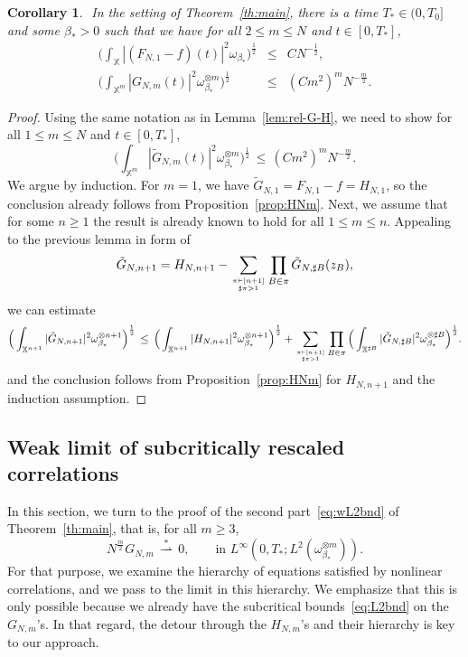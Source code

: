 \documentclass[a4paper,11pt,reqno,noindent]{amsart}
\theoremstyle{plain}
\newtheorem{cor}[theor]{Corollary}
\theoremstyle{definition}
\numberwithin{equation}{section}
\newcommand{\Xd}{\mathbb X}
\begin{document}
\begin{cor}\label{cor:estim-GNm-0}$ $
In the setting of Theorem~\ref{th:main}, there is a time $T_*\in(0,T_0]$ and some $\beta_*>0$ such that we have for all $2\le m\le N$ and $t\in[0,T_*]$,
\begin{eqnarray*}
\Big(\int_{\Xd}|(F_{N,1}-f)(t)|^2\omega_{\beta_*}\Big)^\frac12&\le&CN^{-\frac12},\\
\Big(\int_{\Xd^m}|G_{N,m}(t)|^2\omega_{\beta_*}^{\otimes m}\Big)^\frac12&\le&(Cm^2)^mN^{-\frac m2}.
\end{eqnarray*}
\end{cor}

\begin{proof}
Using the same notation as in Lemma~\ref{lem:rel-G-H}, we need to show for all $1\le m\le N$ and $t\in[0,T_*]$,
\[\Big(\int_{\Xd^m}|\tilde G_{N,m}(t)|^2\omega_{\beta_*}^{\otimes m}\Big)^\frac12\,\le\,(Cm^2)^mN^{-\frac m2}.\]
We argue by induction. For $m=1$, we have $\tilde G_{N,1}=F_{N,1}-f=H_{N,1}$, so the conclusion already follows from Proposition~\ref{prop:HNm}. Next, we assume that for some $n\ge1$ the result is already known to hold for all $1\le m\le n$.
Appealing to the previous lemma in form of
\[\tilde G_{N,n+1}=H_{N,n+1}-\sum_{\pi\vdash[n+1]\atop\sharp\pi>1}\prod_{B\in\pi}\tilde G_{N,\sharp B}(z_B),\]
we can estimate
\begin{equation*}
\Big(\int_{\Xd^{n+1}} |\tilde G_{N,n+1}|^2\omega_{\beta_*}^{\otimes n+1}\Big)^\frac12
\,\le\,\Big(\int_{\Xd^{n+1}} |H_{N,n+1}|^2 \omega_{\beta_*}^{\otimes n+1}\Big)^\frac12
+\sum_{\pi\vdash[n+1]\atop\sharp\pi>1}\prod_{B\in\pi}\Big(\int_{\Xd^{\sharp B}} |\tilde G_{N,\sharp B}|^2\omega_{\beta_*}^{\otimes \sharp B}\Big)^\frac12.
\end{equation*}
and the conclusion follows from Proposition~\ref{prop:HNm} for $H_{N,n+1}$ and the induction assumption.
\end{proof}

\subsection{Weak limit of subcritically rescaled correlations}
In this section, we turn to the proof of the second part~\eqref{eq:wL2bnd} of Theorem~\ref{th:main}, that is, for all $m\ge3$,
\[N^{\frac m2}G_{N,m}\,\overset*\rightharpoonup\,0,\qquad\text{in $L^\infty(0,T_*;L^2(\omega_{\beta_*}^{\otimes m}))$}.\]
For that purpose, we examine the hierarchy of equations satisfied by nonlinear correlations, and we pass to the limit in this hierarchy. We emphasize that this is only possible because we already have the subcritical bounds~\eqref{eq:L2bnd} on the $G_{N,m}$'s. In that regard, the detour through the $H_{N,m}$'s and their hierarchy is key to our approach.
\end{document}
